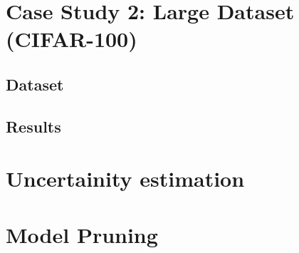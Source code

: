 \section{Case Study 2: Large Dataset (CIFAR-100)}
\subsection{Dataset}
\subsection{Results}

\section{Uncertainity estimation}
\section{Model Pruning}

\ifpdf
    \graphicspath{{Chapter2/Figs/Raster/}{Chapter2/Figs/PDF/}{Chapter2/Figs/}}
\else
    \graphicspath{{Chapter2/Figs/Vector/}{Chapter2/Figs/}}
\fi



